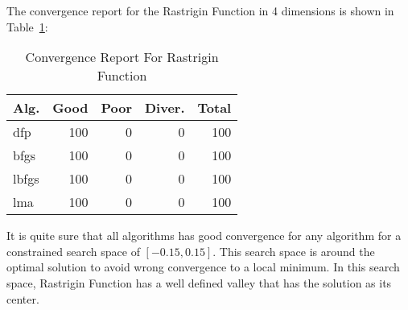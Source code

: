 
The convergence report for the Rastrigin Function in 4 dimensions is shown in Table~\ref{convergence:rastrigin4d}:

\begin{table}[H]
\centering
\caption{Convergence Report For Rastrigin Function}
\label{convergence:rastrigin4d}
\begin{tabular}{lrrrr}
\toprule
 Alg. &  Good &  Poor &  Diver. &  Total \\
\midrule
  dfp &   100 &     0 &       0 &    100 \\
 bfgs &   100 &     0 &       0 &    100 \\
lbfgs &   100 &     0 &       0 &    100 \\
  lma &   100 &     0 &       0 &    100 \\
\bottomrule
\end{tabular}
\end{table}

It is quite sure that all algorithms has good convergence for any algorithm for a
constrained search space of $\left[-0.15, 0.15\right]$. This search space is around
the optimal solution to avoid wrong convergence to a local minimum. In this search space,
Rastrigin Function has a well defined valley that has the solution as its center.